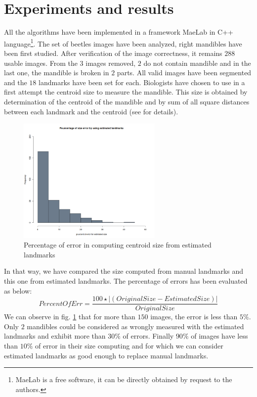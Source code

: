 \documentclass[twoside,twocolumn,10pt]{article}
\begin{document}
\section{Experiments and results}
All the algorithms have been implemented in a framework MaeLab in C++
language\footnote{MaeLab is a free software, it can be directly obtained
 by request to the authors.}. The set of beetles images have
been analyzed, right mandibles have been first studied. After
verification of the image correctness, it remains $288$ usable 
images. From the $3$ images removed, $2$ do not contain mandible and
in the last one, the mandible is broken in $2$ parts. All valid 
images have been segmented and the $18$ landmarks have been set
for each. Biologists have chosen to use in a first attempt the centroid
size to measure the mandible. This size is obtained by determination of the
centroid of the mandible and by sum of all square distances 
between each landmark and the centroid (see \cite{web2010} for
details).
\begin{figure}[h!]
\centering
\includegraphics[width=7cm]{./images/frequency.png}
\caption{\small{Percentage of error in computing centroid size from estimated
landmarks}}
\label{percentage}
\end{figure}

In that way, we have compared the size computed from manual landmarks and this one from estimated
landmarks. The percentage of errors has been evaluated as below: 
{\small{
$$
PercentOfErr = \frac{100 \star |(Original Size - Estimated Size)|}{ Original Size}
$$
}}
We can observe in fig. \ref{percentage} that for more than $150$ images, the error
is less than $5\% $. Only $2$ mandibles could be considered as wrongly
measured with the estimated landmarks and exhibit more than  $30\% $
of errors. Finally $90\% $ of images have less than $10\% $ of error in
their size computing and for which we can consider estimated landmarks
as good enough to replace manual landmarks.
\end{document}
